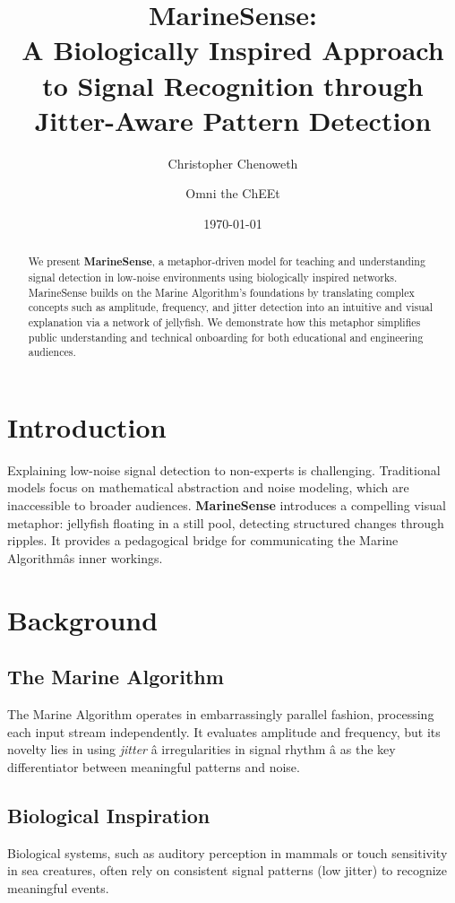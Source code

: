 \documentclass[11pt]{article}
\title{MarineSense:\\A Biologically Inspired Approach to Signal Recognition through Jitter-Aware Pattern Detection}
\author{Christopher Chenoweth \and Omni the ChEEt}
\date{\today}
\begin{document}
\maketitle

\begin{abstract}
We present \textbf{MarineSense}, a metaphor-driven model for teaching and understanding signal detection in low-noise environments using biologically inspired networks. MarineSense builds on the Marine Algorithm's foundations by translating complex concepts such as amplitude, frequency, and jitter detection into an intuitive and visual explanation via a network of jellyfish. We demonstrate how this metaphor simplifies public understanding and technical onboarding for both educational and engineering audiences.
\end{abstract}

\section{Introduction}
Explaining low-noise signal detection to non-experts is challenging. Traditional models focus on mathematical abstraction and noise modeling, which are inaccessible to broader audiences. \textbf{MarineSense} introduces a compelling visual metaphor: jellyfish floating in a still pool, detecting structured changes through ripples. It provides a pedagogical bridge for communicating the Marine Algorithmâs inner workings.

\section{Background}
\subsection{The Marine Algorithm}
The Marine Algorithm operates in embarrassingly parallel fashion, processing each input stream independently. It evaluates amplitude and frequency, but its novelty lies in using \textit{jitter} â irregularities in signal rhythm â as the key differentiator between meaningful patterns and noise.

\subsection{Biological Inspiration}
Biological systems, such as auditory perception in mammals or touch sensitivity in sea creatures, often rely on consistent signal patterns (low jitter) to recognize meaningful events.
\end{document}
